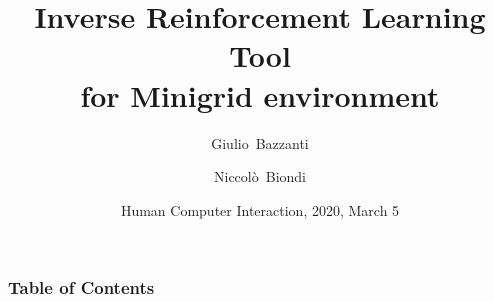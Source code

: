 \documentclass[10pt]{beamer}
\title[Inverse Reinforcement Learning Tool for Minigrid environment] %
{Inverse Reinforcement Learning Tool \\ for Minigrid environment }
\author[Giulio Bazzanti, Niccolò Biondi] %
{Giulio~Bazzanti \and Niccolò~Biondi}
\date[HCI 2020] %
{Human Computer Interaction, 2020, March 5}
\begin{document}
\frame{\titlepage}

\begin{frame}
\frametitle{Table of Contents}
\tableofcontents
\end{frame}







\end{document}
